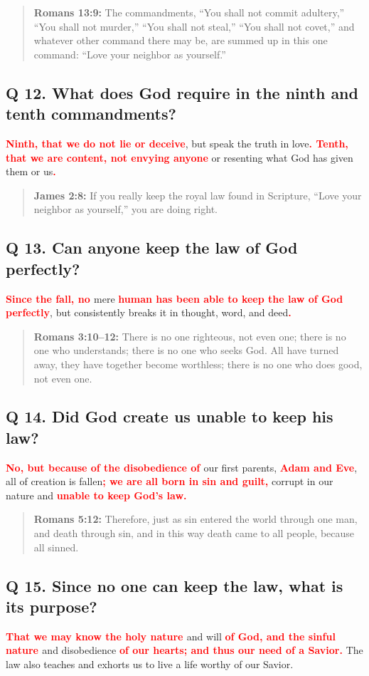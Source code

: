 \documentclass[]{memoir}
\newcommand\Children[1]{\textbf{\textcolor{red}{#1}}}
\newcommand\Quote[2]{\begin{quote}{\textbf{#1:}{ #2}}\end{quote}}
\begin{document}
\Quote{Romans 13:9}{The commandments, ``You shall not commit adultery,'' ``You shall not murder,'' ``You shall not steal,'' ``You shall not covet,'' and whatever other command there may be, are summed up in this one command: ``Love your neighbor as yourself.''}

\subsection{Q 12. What does God require in the ninth and tenth commandments?}
\Children{Ninth, that we do not lie or deceive}, but speak the truth in love\Children{. Tenth, that we are content, not envying anyone} or resenting what God has given them or us\Children{.}

\Quote{James 2:8}{If you really keep the royal law found in Scripture, ``Love your neighbor as yourself,'' you are doing right.}

\subsection{Q 13. Can anyone keep the law of God perfectly?}
\Children{Since the fall, no }mere \Children{human has been able to keep the law of God perfectly}, but consistently breaks it in thought, word, and deed\Children{.}

\Quote{Romans 3:10--12}{There is no one righteous, not even one; there is no one who understands; there is no one who seeks God. All have turned away, they have together become worthless; there is no one who does good, not even one.}

\subsection{Q 14. Did God create us unable to keep his law?}
\Children{No, but because of the disobedience of }our first parents, \Children{Adam and Eve}, all of creation is fallen\Children{; we are all born in sin and guilt,} corrupt in our nature and \Children{ unable to keep God's law.}

\Quote{Romans 5:12}{Therefore, just as sin entered the world through one man, and death through sin, and in this way death came to all people, because all sinned.}

\subsection{Q 15. Since no one can keep the law, what is its purpose?}
\Children{That we may know the holy nature }and will \Children{of God, and the sinful nature }and disobedience \Children{of our hearts; and thus our need of a Savior.} The law also teaches and exhorts us to live a life worthy of our Savior.
\end{document}
